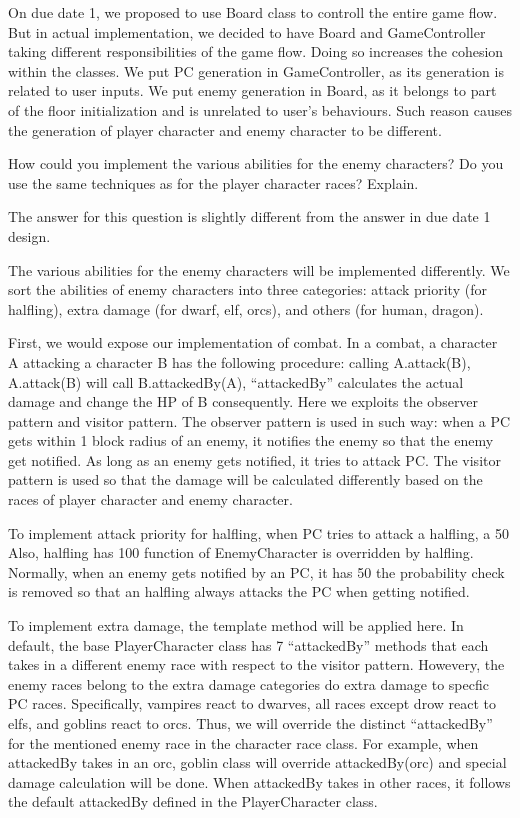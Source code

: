 \documentclass[11pt]{article}
\theoremstyle{plain} \newtheorem{theorem*}{Theorem}[subsection]
\begin{document}
On due date 1, we proposed to use Board class to controll the entire game flow.
But in actual implementation, we decided to have Board and GameController
taking different responsibilities of the game flow. Doing so increases the
cohesion within the classes. We put PC generation in GameController, as its
generation is related to user inputs. We put enemy generation in Board, as it
belongs to part of the floor initialization and is unrelated to user’s
behaviours. Such reason causes the generation of player character and enemy
character to be different. 

How could you implement the various abilities for the enemy characters? Do you
use the same techniques as for the player character races? Explain. 

The answer for this question is slightly different from the answer in due date
1 design. 

The various abilities for the enemy characters will be implemented differently.
We sort the abilities of enemy characters into three categories: attack
priority (for halfling), extra damage (for dwarf, elf, orcs), and others (for
human, dragon).  

First, we would expose our implementation of combat. In a combat, a character A
attacking a character B has the following procedure: calling A.attack(B),
A.attack(B) will call B.attackedBy(A), “attackedBy” calculates the actual
damage and change the HP of B consequently. Here we exploits the observer
pattern and visitor pattern. The observer pattern is used in such way: when a
PC gets within 1 block radius of an enemy, it notifies the enemy so that the
enemy get notified. As long as an enemy gets notified, it tries to attack PC.
The visitor pattern is used so that the damage will be calculated differently
based on the races of player character and enemy character. 

To implement attack priority for halfling, when PC tries to attack a halfling,
a 50%
Also, halfling has 100%
function of EnemyCharacter is overridden by halfling. Normally, when an enemy
gets notified by an PC, it has 50%
the probability check is removed so that an halfling always attacks the PC when
getting notified. 

To implement extra damage, the template method will be applied here. In
default, the base PlayerCharacter class has 7 “attackedBy” methods that each
takes in a different enemy race with respect to the visitor pattern. Howevery,
the enemy races belong to the extra damage categories do extra damage to
specfic PC races. Specifically, vampires react to dwarves, all races except
drow react to elfs, and goblins react to orcs. Thus, we will override the
distinct “attackedBy” for the mentioned enemy race in the character race class.
For example,  when attackedBy takes in an orc, goblin class will override
attackedBy(orc) and special damage calculation will be done. When attackedBy
takes in other races, it follows the default attackedBy defined in the
PlayerCharacter class. 
\end{document}
